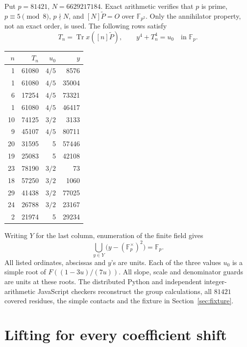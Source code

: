 \documentclass[11pt,a4paper]{article}
\DeclareMathOperator{\Tr}{Tr}
\begin{document}
Put \(p=81421\), \(N=6629217184\).
Exact arithmetic verifies that \(p\) is prime,
\(p\equiv5\pmod8\), \(p\nmid N\), and
\([N]\widetilde P=O\) over \(\mathbb F_{p^2}\).
Only the annihilator property, not an exact order, is used.
The following rows satisfy
\[
 T_n=\Tr x([n]\widetilde P),\qquad y^4+T_n^4=u_0
       \quad\text{in }\mathbb F_p.
\]
\begin{center}
\begin{tabular}{rrrr}\toprule
\(n\)&\(T_n\)&\(u_0\)&\(y\)\\\midrule
1&61080&\(4/5\)&8576\\
1&61080&\(4/5\)&35004\\
6&17254&\(4/5\)&73321\\
1&61080&\(4/5\)&46417\\
10&74125&\(3/2\)&3133\\
9&45107&\(4/5\)&80711\\
20&31595&5&57446\\
19&25083&5&42108\\
23&78190&\(3/2\)&73\\
18&57250&\(3/2\)&1060\\
29&41438&\(3/2\)&77025\\
24&26788&\(3/2\)&23167\\
2&21974&5&29234\\\bottomrule
\end{tabular}
\end{center}
Writing \(Y\) for the last column, enumeration of the finite field gives
\begin{equation}\label{eq:coverage}
 \bigcup_{y\in Y}\bigl(y-(\mathbb F_p^\times)^2\bigr)=\mathbb F_p.
\end{equation}
All listed ordinates, abscissas and \(y\)'s are units. Each of the
three values \(u_0\) is a simple root of \(F((1-3u)/(7u))\).
All slope, scale and denominator guards are units at these roots.
The distributed Python and independent integer-arithmetic JavaScript
checkers reconstruct the group calculations, all \(81421\) covered
residues, the simple contacts and the fixture in Section~\ref{sec:fixture}.

\section{Lifting for every coefficient shift}
\end{document}
